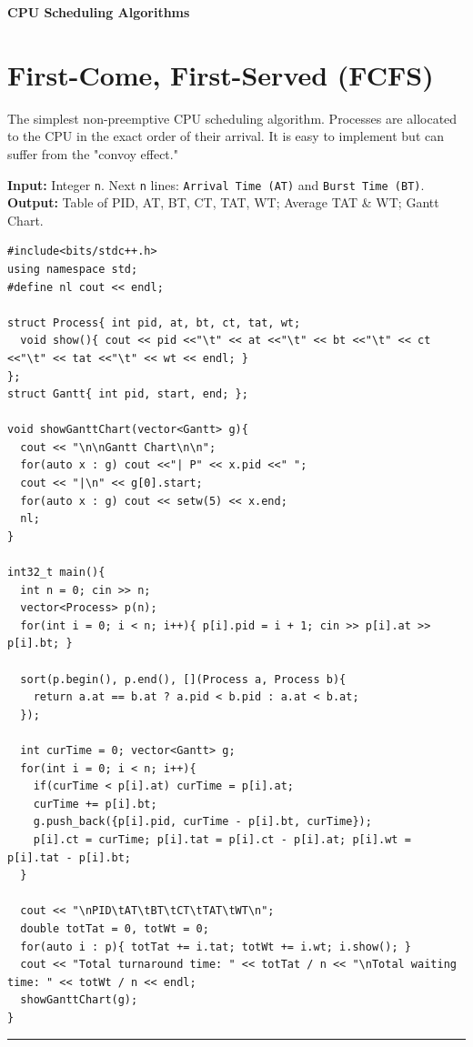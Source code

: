 \documentclass[10pt, a4paper]{article}
\begin{document}
\begin{center}
    {\LARGE \textbf{CPU Scheduling Algorithms}}\\[0.5em]
\end{center}
\vspace{0.5em}

\section{First-Come, First-Served (FCFS)}
The simplest non-preemptive CPU scheduling algorithm. Processes are allocated to the CPU in the exact order of their arrival. It is easy to implement but can suffer from the "convoy effect."

\begin{tcolorbox}[title=Input \& Output Format, iobox]
\textbf{Input:} Integer \texttt{n}. Next \texttt{n} lines: \texttt{Arrival Time (AT)} and \texttt{Burst Time (BT)}.\\
\textbf{Output:} Table of PID, AT, BT, CT, TAT, WT; Average TAT \& WT; Gantt Chart.
\end{tcolorbox}

\begin{lstlisting}
#include<bits/stdc++.h>
using namespace std;
#define nl cout << endl;

struct Process{ int pid, at, bt, ct, tat, wt;
  void show(){ cout << pid <<"\t" << at <<"\t" << bt <<"\t" << ct <<"\t" << tat <<"\t" << wt << endl; }
};
struct Gantt{ int pid, start, end; };

void showGanttChart(vector<Gantt> g){
  cout << "\n\nGantt Chart\n\n";
  for(auto x : g) cout <<"| P" << x.pid <<" ";
  cout << "|\n" << g[0].start;
  for(auto x : g) cout << setw(5) << x.end;
  nl;
}

int32_t main(){
  int n = 0; cin >> n;
  vector<Process> p(n);
  for(int i = 0; i < n; i++){ p[i].pid = i + 1; cin >> p[i].at >> p[i].bt; }
  
  sort(p.begin(), p.end(), [](Process a, Process b){
    return a.at == b.at ? a.pid < b.pid : a.at < b.at;
  });

  int curTime = 0; vector<Gantt> g;
  for(int i = 0; i < n; i++){
    if(curTime < p[i].at) curTime = p[i].at;
    curTime += p[i].bt;
    g.push_back({p[i].pid, curTime - p[i].bt, curTime});
    p[i].ct = curTime; p[i].tat = p[i].ct - p[i].at; p[i].wt = p[i].tat - p[i].bt;
  }

  cout << "\nPID\tAT\tBT\tCT\tTAT\tWT\n";
  double totTat = 0, totWt = 0;
  for(auto i : p){ totTat += i.tat; totWt += i.wt; i.show(); }
  cout << "Total turnaround time: " << totTat / n << "\nTotal waiting time: " << totWt / n << endl;
  showGanttChart(g);
}
\end{lstlisting}
\vspace{1em}
\hrule
\vspace{1em}
\end{document}
